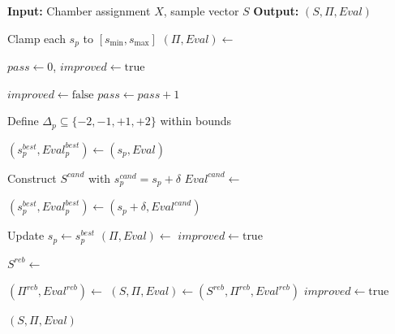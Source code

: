 \documentclass[11pt]{article}
\begin{document}
\begin{algorithm}[H]
\caption{Sample Size Optimization by Local Search}
\label{alg:sample_ls}
\begin{algorithmic}[1]

\State \textbf{Input:} Chamber assignment $X$, sample vector $S$
\State \textbf{Output:} $(S, \Pi, Eval)$

\State Clamp each $s_p$ to $[s_{\min}, s_{\max}]$
\State $(\Pi, Eval) \gets$ 

\State $pass \gets 0$, \quad $improved \gets \text{true}$

    \State $improved \gets \text{false}$
    \State $pass \gets pass + 1$


        \State Define $\Delta_p \subseteq \{-2,-1,+1,+2\}$ within bounds

        \State $(s_p^{best}, Eval_p^{best}) \gets (s_p, Eval)$

            \State Construct $S^{cand}$ with $s_p^{cand} = s_p + \delta$
            \State $Eval^{cand} \gets$ 

                \State $(s_p^{best}, Eval_p^{best}) \gets (s_p+\delta, Eval^{cand})$
            \EndIf
        \EndFor

            \State Update $s_p \gets s_p^{best}$
            \State $(\Pi, Eval) \gets$ 
            \State $improved \gets \text{true}$
        \EndIf

    \EndFor

    \State $S^{reb} \gets$ 

        \State $(\Pi^{reb}, Eval^{reb}) \gets$ 
            \State $(S, \Pi, Eval) \gets (S^{reb}, \Pi^{reb}, Eval^{reb})$
            \State $improved \gets \text{true}$
        \EndIf
    \EndIf

\EndWhile

\State \Return $(S, \Pi, Eval)$

\end{algorithmic}
\end{algorithm}
\end{document}
